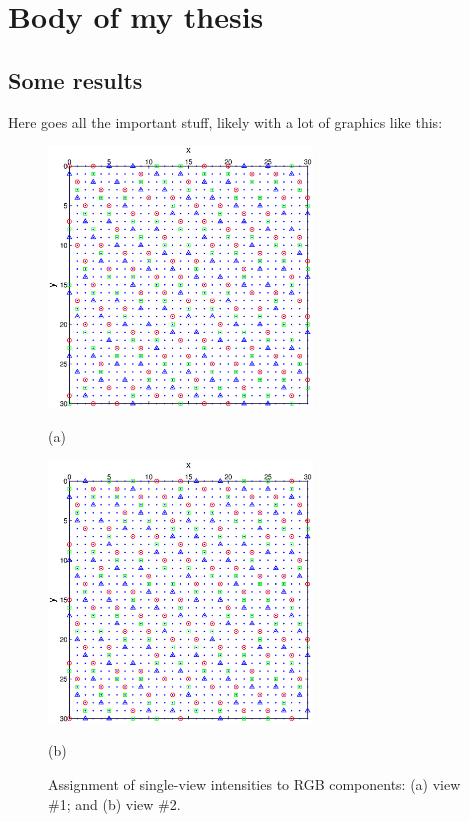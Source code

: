 \chapter{Body of my thesis}
\label{chapter:body}
\thispagestyle{myheadings}

\graphicspath{{2_Body/Figures/}}

\section{Some results}
\label{sec:results}

Here goes all the important stuff, likely with a lot of graphics like this:

\begin{figure}[htb]
  \begin{minipage}[t]{0.49\linewidth}\centering
    \includegraphics[width=7cm]{figure_sampling_view1.eps}
    \medskip
    \centerline{(a)}
  \end{minipage}\hfill
  \begin{minipage}[t]{0.49\linewidth}\centering
    \includegraphics[width=7cm]{figure_sampling_view2.eps}
    \medskip
    \centerline{(b)}
  \end{minipage}
  \caption{Assignment of single-view intensities to RGB components: (a) view
    \#1; and (b) view \#2. }
  \label{fig:Sampling}
\end{figure}

